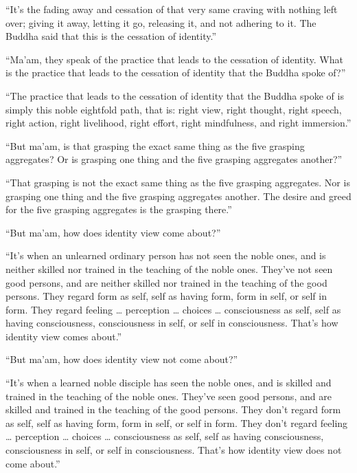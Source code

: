 \documentclass[12pt,openany]{book}%
\begin{document}
“It’s the fading away and cessation of that very same craving with nothing left over; giving it away, letting it go, releasing it, and not adhering to it. The Buddha said that this is the cessation of identity.” 

“Ma’am, they speak of the practice that leads to the cessation of identity. What is the practice that leads to the cessation of identity that the Buddha spoke of?” 

“The practice that leads to the cessation of identity that the Buddha spoke of is simply this noble eightfold path, that is: right view, right thought, right speech, right action, right livelihood, right effort, right mindfulness, and right immersion.” 

“But ma’am, is that grasping the exact same thing as the five grasping aggregates? Or is grasping one thing and the five grasping aggregates another?” 

“That grasping is not the exact same thing as the five grasping aggregates. Nor is grasping one thing and the five grasping aggregates another. The desire and greed for the five grasping aggregates is the grasping there.” 

“But ma’am, how does identity view come about?” 

“It’s when an unlearned ordinary person has not seen the noble ones, and is neither skilled nor trained in the teaching of the noble ones. They’ve not seen good persons, and are neither skilled nor trained in the teaching of the good persons. They regard form as self, self as having form, form in self, or self in form. They regard feeling … perception … choices … consciousness as self, self as having consciousness, consciousness in self, or self in consciousness. That’s how identity view comes about.” 

“But ma’am, how does identity view not come about?” 

“It’s when a learned noble disciple has seen the noble ones, and is skilled and trained in the teaching of the noble ones. They’ve seen good persons, and are skilled and trained in the teaching of the good persons. They don’t regard form as self, self as having form, form in self, or self in form. They don’t regard feeling … perception … choices … consciousness as self, self as having consciousness, consciousness in self, or self in consciousness. That’s how identity view does not come about.” 
\end{document}
